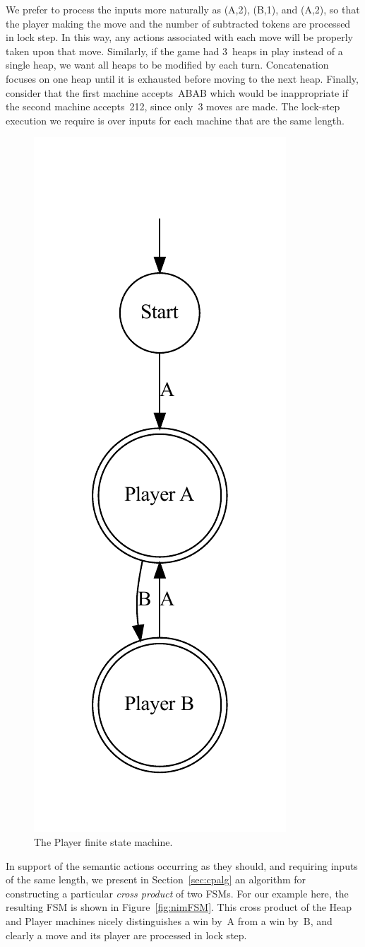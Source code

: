 \documentclass[sigplan,anonymous, review]{acmart}
\begin{document}
We prefer to process the inputs more naturally as (A,2), (B,1), and (A,2), so that the player making the move and the number of subtracted tokens are processed in lock step.  In this way, any actions associated with each move will be properly taken upon that move.  Similarly, if the game had 3~heaps in play instead of a single heap, we want all heaps to be modified by each turn.  Concatenation focuses on one heap until it is exhausted before moving to the next heap.   Finally, consider that the first machine accepts~ABAB which would be inappropriate if the second machine accepts~212, since only~3 moves are made.  The lock-step execution we require is over inputs for each machine that are the same length.

\begin{figure}
    \centering
    \includegraphics[width=0.35\linewidth]{figures/nimexample/playerFSM.pdf}
    \caption{The Player finite state machine.}
    \label{fig:nimPlayerFSM}
\end{figure}

In support of the semantic actions occurring as they should, and requiring inputs of the same length, we present in Section~\ref{sec:cpalg} an algorithm for constructing a particular \emph{cross product} of two FSMs.  For our example here, the resulting FSM is shown in Figure~\ref{fig:nimFSM}.  This cross product of the Heap and Player machines nicely distinguishes a win by~A from a win by~B, and clearly a move and its player are processed in lock step.
\end{document}
